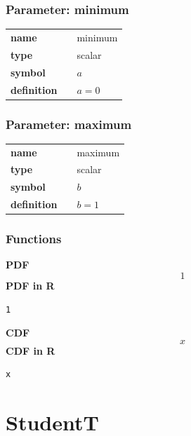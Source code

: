 \subsubsection*{Parameter: minimum}

\noindent\begin{tabular}{p{2cm}cl}
\textbf{name} & & minimum \\
\textbf{type} & & scalar \\
\textbf{symbol} & & $a$  \\
\textbf{definition} & & $a=0$
\end{tabular}
\subsubsection*{Parameter: maximum}

\noindent\begin{tabular}{p{2cm}cl}
\textbf{name} & & maximum \\
\textbf{type} & & scalar \\
\textbf{symbol} & & $b$  \\
\textbf{definition} & & $b=1$
\end{tabular}
\subsubsection*{Functions}

\smallskip \noindent \hspace{.2cm} \textbf{PDF} 
\begin{equation*}1\end{equation*}
\smallskip \noindent \hspace{.2cm} \textbf{PDF in R}  
\begin{verbatim}1\end{verbatim}
\smallskip \noindent \hspace{.2cm} \textbf{CDF} 
\begin{equation*}x\end{equation*}
\smallskip \noindent \hspace{.2cm} \textbf{CDF in R}  
\begin{verbatim}x\end{verbatim}
\smallskip\section*{StudentT} 

  \bigskip 

